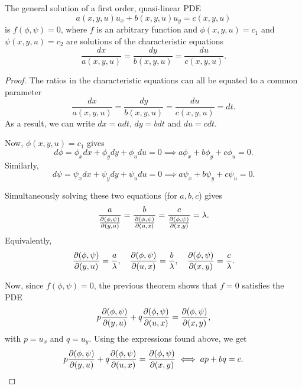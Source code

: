 \documentclass[11pt]{penrose}
\begin{document}
\begin{nthm}
    The general solution of a first order, quasi-linear PDE
    \begin{equation}
        a(x,y,u) u_x + b(x,y,u) u_y = c(x,y,u)
    \end{equation}
    is $f(\phi, \psi) = 0$, where $f$ is an arbitrary function and $\phi(x,y,u)=c_1$ and $\psi(x,y,u)=c_2$ are solutions of the characteristic equations
    \begin{equation}
        \frac{dx}{a(x,y,u)} = \frac{dy}{b(x,y,u)} = \frac{du}{c(x,y,u)}.
    \end{equation}

\end{nthm}
\begin{proof}
    The ratios in the characteristic equations can all be equated to a common parameter
    \begin{equation}
        \frac{dx}{a(x,y,u)} = \frac{dy}{b(x,y,u)} = \frac{du}{c(x,y,u)} = dt.
    \end{equation}
    As a result, we can write $dx = a dt$, $dy = b dt$ and $du = c dt$.

    Now, $\phi(x,y,u) = c_1$ gives
    \begin{equation}
        d\phi = \phi_x dx + \phi_y dy + \phi_u du = 0
        \implies a \phi_x + b \phi_y + c \phi_u = 0.
    \end{equation}
    Similarly,
    \begin{equation}
        d\psi = \psi_x dx + \psi_y dy + \psi_u du = 0
        \implies a \psi_x + b \psi_y + c \psi_u = 0.
    \end{equation}

    Simultaneously solving these two equations (for $a, b, c$) gives
    \begin{equation}
        \frac{a}{\frac{\partial(\phi, \psi)}{\partial(y,u)}} = \frac{b}{\frac{\partial(\phi, \psi)}{\partial(u,x)}} = \frac{c}{\frac{\partial(\phi, \psi)}{\partial(x,y)}} = \lambda.
    \end{equation}
    Equivalently,
    \begin{equation}
        \frac{\partial(\phi, \psi)}{\partial(y,u)} = \frac{a}{\lambda}, \quad
        \frac{\partial(\phi, \psi)}{\partial(u,x)} = \frac{b}{\lambda}, \quad
        \frac{\partial(\phi, \psi)}{\partial(x,y)} = \frac{c}{\lambda}.
    \end{equation}

    Now, since $f(\phi, \psi) = 0$, the previous theorem shows that $f = 0$ satisfies the PDE
    \begin{equation}
        p \frac{\partial(\phi, \psi)}{\partial(y,u)}
        + q \frac{\partial(\phi, \psi)}{\partial(u,x)}
        = \frac{\partial(\phi, \psi)}{\partial(x,y)},
    \end{equation}
    with $p = u_x$ and $q = u_y$. Using the expressions found above, we get
    \begin{equation}
        p \frac{\partial(\phi, \psi)}{\partial(y,u)}
        + q \frac{\partial(\phi, \psi)}{\partial(u,x)}
        = \frac{\partial(\phi, \psi)}{\partial(x,y)}
        \iff
        a p + b q = c.
    \end{equation}


\end{proof}
\end{document}
